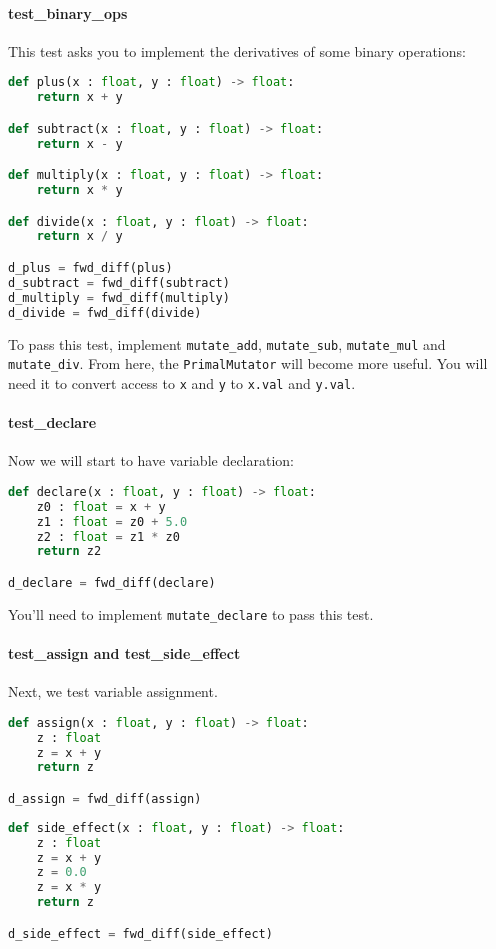 \paragraph{test_binary_ops} This test asks you to implement the derivatives of some binary operations:
\begin{lstlisting}[language=Python]
def plus(x : float, y : float) -> float:
    return x + y

def subtract(x : float, y : float) -> float:
    return x - y

def multiply(x : float, y : float) -> float:
    return x * y

def divide(x : float, y : float) -> float:
    return x / y

d_plus = fwd_diff(plus)
d_subtract = fwd_diff(subtract)
d_multiply = fwd_diff(multiply)
d_divide = fwd_diff(divide)
\end{lstlisting}
To pass this test, implement \lstinline{mutate_add}, \lstinline{mutate_sub}, \lstinline{mutate_mul} and \lstinline{mutate_div}. From here, the \lstinline{PrimalMutator} will become more useful. You will need it to convert access to \lstinline{x} and \lstinline{y} to \lstinline{x.val} and \lstinline{y.val}.

\paragraph{test_declare} Now we will start to have variable declaration:
\begin{lstlisting}[language=Python]
def declare(x : float, y : float) -> float:
    z0 : float = x + y
    z1 : float = z0 + 5.0
    z2 : float = z1 * z0
    return z2

d_declare = fwd_diff(declare)
\end{lstlisting}
You'll need to implement \lstinline{mutate_declare} to pass this test.

\paragraph{test_assign and test_side_effect} Next, we test variable assignment.
\begin{lstlisting}[language=Python]
def assign(x : float, y : float) -> float:
    z : float
    z = x + y
    return z

d_assign = fwd_diff(assign)
\end{lstlisting}

\begin{lstlisting}[language=Python]
def side_effect(x : float, y : float) -> float:
    z : float
    z = x + y
    z = 0.0
    z = x * y
    return z

d_side_effect = fwd_diff(side_effect)
\end{lstlisting}

